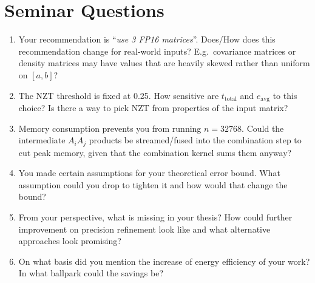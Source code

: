 \documentclass[11pt,a4paper]{article}
\newcommand{\q}[1]{``\textit{#1}''}
\begin{document}
\section{Seminar Questions}
\begin{enumerate}[leftmargin=*]
  \item Your recommendation is \q{use 3 FP16 matrices}. Does/How does this recommendation change for real-world inputs?
    E.g.~covariance matrices or density matrices may have values that are heavily skewed rather than uniform on $[a,b]$?
  \item The NZT threshold is fixed at 0.25. How sensitive are $t_{\text{total}}$ and $e_{\text{avg}}$ to this choice? Is there a way to pick NZT from properties of the input matrix?
  \item Memory consumption prevents you from running $n=32768$.
    Could the intermediate $A_iA_j$ products be streamed/fused into the combination step to cut peak memory, given that the combination kernel sums them anyway?
  \item You made certain assumptions for your theoretical error bound. What assumption could you drop to tighten it and how would that change the bound?
  \item From your perspective, what is missing in your thesis? How could further improvement on precision refinement look like and what alternative approaches look promising?
  \item On what basis did you mention the increase of energy efficiency of your work?
    In what ballpark could the savings be?
\end{enumerate}
\end{document}
